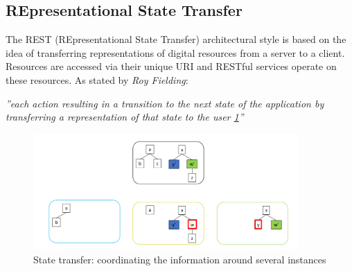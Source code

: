 \documentclass[10pt,a4paper]{report}
\begin{document}
\subsection{REpresentational State Transfer}
The REST (REpresentational State Transfer) architectural style is based on the idea of transferring representations of digital resources from a server to a client. Resources are accessed via their unique URI and RESTful services operate on
these resources. As stated by \textit{Roy Fielding}:
\begin{center}
	\textit{”each action resulting in a transition to the next state of the application by transferring a representation of that state to the user \ref{image65}”}
\end{center}
\begin{figure}[h]
	\centering
	\includegraphics[width=0.9\textwidth]{image65}
	\caption{State transfer: coordinating the information around several instances}
	\label{image65}
\end{figure} 
\end{document}
